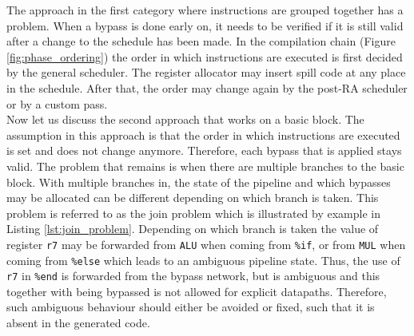 The approach in the first category where instructions are grouped together has a problem. When a bypass is done early on, it needs to be verified if it is still valid after a change to the schedule has been made. In the compilation chain (Figure \ref{fig:phase_ordering}) the order in which instructions are executed is first decided by the general scheduler. The register allocator may insert spill code at any place in the schedule. After that, the order may change again by the post-RA scheduler or by a custom pass.\\

Now let us discuss the second approach that works on a basic block. The assumption in this approach is that the order in which instructions are executed is set and does not change anymore. Therefore, each bypass that is applied stays valid. 
The problem that remains is when there are multiple branches to the basic block. With multiple branches in, the state of the pipeline and which bypasses may be allocated can be different depending on which branch is taken. This problem is referred to as the join problem which is illustrated by example in Listing \ref{lst:join_problem}. Depending on which branch is taken the value of register \texttt{r7} may be forwarded from \texttt{ALU} when coming from \texttt{\%if}, or from \texttt{MUL} when coming from \texttt{\%else} which leads to an ambiguous pipeline state. Thus, the use of \texttt{r7} in \texttt{\%end} is forwarded from the bypass network, but is ambiguous and this together with being bypassed is not allowed for explicit datapaths. Therefore, such ambiguous behaviour should either be avoided or fixed, such that it is absent in the generated code.

